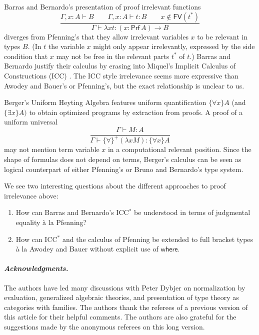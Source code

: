 \documentclass{LMCS}
\theoremstyle{plain}\newtheorem{satz}[thm]{Satz}
\newcommand{\LONGVERSION}[1]{#1}
\newcommand{\SHORTVERSION}[1]{}
\newcommand{\of}{\!:\!}
\newcommand{\derN}{\vdash}
\newcommand{\FV}{\mathsf{FV}}
\newcommand{\funT}[2]{(#1 \of #2) \to}
\newcommand{\boxty}[1]{[#1]}
\renewcommand{\boxty}[1]{\mathsf{Prf}\,#1}
\newcommand{\whereraw}{\mathsf{where}}
\newcommand{\LONGVERSION}[1]{}
\newcommand{\SHORTVERSION}[1]{#1}
\newcommand{\LONGSHORT}[2]{\LONGVERSION{#1}\SHORTVERSION{#2}}
\newcommand{\para}[1]{
\LONGSHORT{\paragraph{\it #1.}}
          {\vspace{1ex}\noindent{\it #1.}}
}
\begin{document}
Barras and Bernardo's \cite{DBLP:conf/fossacs/BarrasB08} presentation of
proof irrelevant functions
\[
  \dfrac{\Gamma, x : A \derN B \qquad 
      \Gamma, x : A \derN t : B \qquad x \not\in\FV(t^*)
    }{\Gamma \derN \lambda x t :  \funT x {\boxty A} B}
\]
diverges from Pfenning's that they allow irrelevant variables $x$ to
be relevant in types $B$.  (In $t$ the variable $x$ might only
appear irrelevantly, expressed by the side condition that $x$ may not be
free in the relevant parts $t^*$ of $t$.)
Barras and Bernardo justify their calculus by erasing into Miquel's
Implicit Calculus of Constructions (ICC) \cite{miquel:tlca01}. The ICC
style irrelevance seems more expressive than Awodey and Bauer's or
Pfenning's, but the exact relationship is unclear to us.



Berger's Uniform Heyting Algebra \cite{berger:uniformHA} features
uniform quantification $\{\forall x\}A$  (and $\{\exists x\}A)$ to
obtain optimized programs by extraction from proofs.  A proof of a
uniform universal
\[
  \dfrac{\Gamma \derN M : A
    }{\Gamma \derN \{\forall\}^+(\lambda x M) : \{\forall x\}A}
\]
may not mention term variable $x$ in a computational relevant
position.  Since the shape of formulas does not depend on terms,
Berger's calculus can be seen as logical counterpart of
either Pfenning's or Bruno and Bernardo's type system.

We see two interesting questions about the different approaches to
proof irrelevance above:
\begin{enumerate}[(1)]
\item How can Barras and Bernardo's ICC$^*$ be understood in
  terms of judgmental equality \`a la Pfenning?
\item How can ICC$^*$ and the calculus of Pfenning be extended to full
  bracket types \`a la Awodey and Bauer without explicit use of $\whereraw$.
\end{enumerate}

 
\para{Acknowledgments} The authors have led many discussions with Peter
Dybjer on normalization by evaluation, generalized algebraic theories,
and presentation of type theory as categories with families.  The
authors thank the referees of a previous version of this article for
their helpful comments. The authors are also grateful for the
suggestions made by the anonymous referees on this long version. 




\appendix
\end{document}
